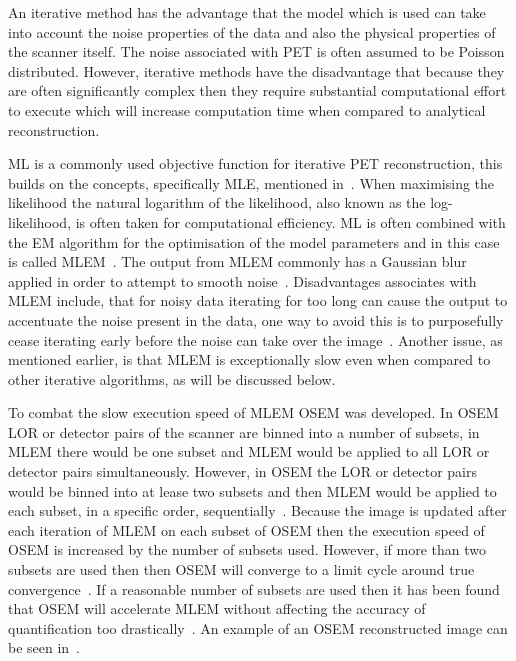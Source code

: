             An iterative method has the advantage that the model which is used can take into account the noise properties of the data and also the physical properties of the scanner itself. The noise associated with \gls{PET} is often assumed to be Poisson distributed. However, iterative methods have the disadvantage that because they are often significantly complex then they require substantial computational effort to execute which will increase computation time when compared to analytical reconstruction.
            
            \gls{ML} is a commonly used objective function for iterative \gls{PET} reconstruction, this builds on the concepts, specifically \gls{MLE}, mentioned in~. When maximising the likelihood the natural logarithm of the likelihood, also known as the log-likelihood, is often taken for computational efficiency. \gls{ML} is often combined with the \gls{EM} algorithm for the optimisation of the model parameters and in this case is called \gls{MLEM}~. The output from \gls{MLEM} commonly has a Gaussian blur applied in order to attempt to smooth noise~. Disadvantages associates with \gls{MLEM} include, that for noisy data iterating for too long can cause the output to accentuate the noise present in the data, one way to avoid this is to purposefully cease iterating early before the noise can take over the image~. Another issue, as mentioned earlier, is that \gls{MLEM} is exceptionally slow even when compared to other iterative algorithms, as will be discussed below.
            
            To combat the slow execution speed of \gls{MLEM} \gls{OSEM} was developed. In \gls{OSEM} \gls{LOR} or detector pairs of the scanner are binned into a number of subsets, in \gls{MLEM} there would be one subset and \gls{MLEM} would be applied to all \gls{LOR} or detector pairs simultaneously. However, in \gls{OSEM} the \gls{LOR} or detector pairs would be binned into at lease two subsets and then \gls{MLEM} would be applied to each subset, in a specific order, sequentially~. Because the image is updated after each iteration of \gls{MLEM} on each subset of \gls{OSEM} then the execution speed of \gls{OSEM} is increased by the number of subsets used. However, if more than two subsets are used then then \gls{OSEM} will converge to a limit cycle around true convergence~. If a reasonable number of subsets are used then it has been found that \gls{OSEM} will accelerate \gls{MLEM} without affecting the accuracy of quantification too drastically~. An example of an \gls{OSEM} reconstructed image can be seen in~.
            
